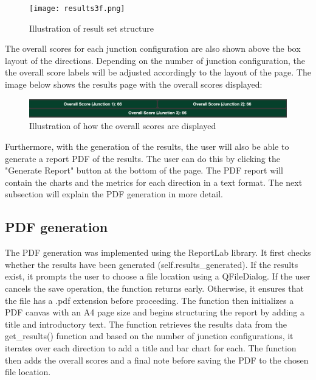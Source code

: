 \documentclass{article}
\begin{document}
        \begin{figure}[H]
            \centering
            \texttt{[image: results3f.png]}
            \caption{Illustration of result set structure} 
            \label{fig:results3d}
        \end{figure}
        
        The overall scores for each junction configuration are also shown above the box layout of the directions. Depending on the number of junction configuration, the 
        the overall score labels will be adjusted accordingly to the layout of the page. The image below shows the results page with the overall scores displayed:

        \begin{figure}[H]
            \centering
            \includegraphics[width=\textwidth]{overallScores.png}
            \caption{Illustration of how the overall scores are displayed} 
            \label{fig:overallScores}
        \end{figure}

        Furthermore, with the generation of the results, the user will also be able to generate a report PDF of the results. The user can do this by clicking the "Generate Report" button at the bottom of the page. 
        The PDF report will contain the charts and the metrics for each direction in a text format. The next subsection will explain the PDF generation in more detail.

    \subsection{PDF generation}

        The PDF generation was implemented using the ReportLab library. It first checks whether the results have been generated (self.results_generated). If the results exist, it prompts the user to choose a file 
        location using a QFileDialog. If the user cancels the save operation, the function returns early. Otherwise, it ensures that the file has a .pdf extension before proceeding. The function then initializes a 
        PDF canvas with an A4 page size and begins structuring the report by adding a title and introductory text. The function retrieves the results data from the get_results() function and based on the number of junction 
        configurations, it iterates over each direction to add a title and bar chart for each. The function then adds the overall scores and a final note before saving the PDF to the chosen file location.
\end{document}
